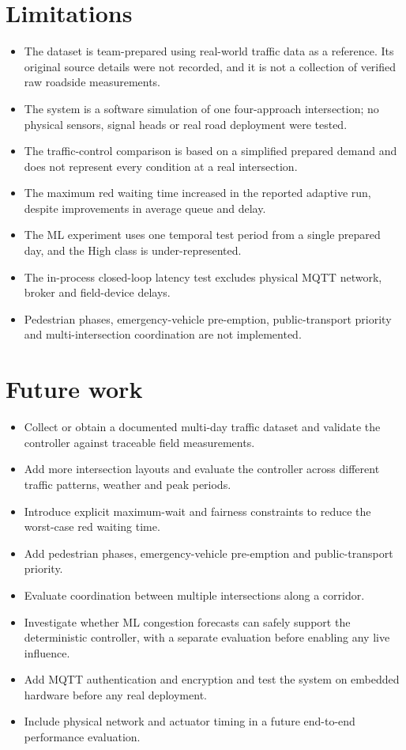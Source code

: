 \documentclass[12pt,a4paper,oneside]{report}
\begin{document}
\section{Limitations}
\begin{itemize}
  \item The dataset is team-prepared using real-world traffic data as a reference. Its original source details were not recorded, and it is not a collection of verified raw roadside measurements.
  \item The system is a software simulation of one four-approach intersection; no physical sensors, signal heads or real road deployment were tested.
  \item The traffic-control comparison is based on a simplified prepared demand and does not represent every condition at a real intersection.
  \item The maximum red waiting time increased in the reported adaptive run, despite improvements in average queue and delay.
  \item The ML experiment uses one temporal test period from a single prepared day, and the High class is under-represented.
  \item The in-process closed-loop latency test excludes physical MQTT network, broker and field-device delays.
  \item Pedestrian phases, emergency-vehicle pre-emption, public-transport priority and multi-intersection coordination are not implemented.
\end{itemize}

\section{Future work}
\begin{itemize}
  \item Collect or obtain a documented multi-day traffic dataset and validate the controller against traceable field measurements.
  \item Add more intersection layouts and evaluate the controller across different traffic patterns, weather and peak periods.
  \item Introduce explicit maximum-wait and fairness constraints to reduce the worst-case red waiting time.
  \item Add pedestrian phases, emergency-vehicle pre-emption and public-transport priority.
  \item Evaluate coordination between multiple intersections along a corridor.
  \item Investigate whether ML congestion forecasts can safely support the deterministic controller, with a separate evaluation before enabling any live influence.
  \item Add MQTT authentication and encryption and test the system on embedded hardware before any real deployment.
  \item Include physical network and actuator timing in a future end-to-end performance evaluation.
\end{itemize}
\end{document}
